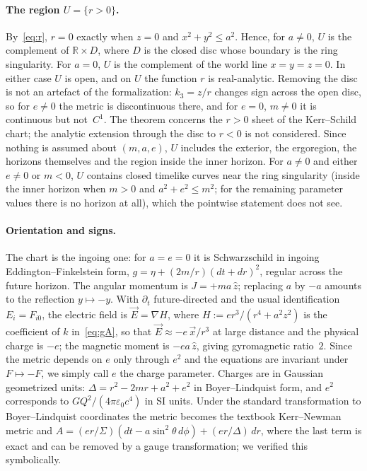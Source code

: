 \documentclass[11pt]{article}
\theoremstyle{definition}
\theoremstyle{remark}
\newcommand{\R}{\mathbb{R}}
\begin{document}
\paragraph{The region $U=\{r>0\}$.}
By~\eqref{eq:r}, $r=0$ exactly when $z=0$ and $x^2+y^2\le a^2$.
Hence, for $a\neq 0$, $U$ is the complement of $\R\times D$, where $D$ is the closed disc whose boundary is the ring singularity.
For $a=0$, $U$ is the complement of the world line $x=y=z=0$.
In either case $U$ is open, and on $U$ the function $r$ is real-analytic.
Removing the disc is not an artefact of the formalization: $k_3=z/r$ changes sign across the open disc, so for $e\neq0$ the metric is discontinuous there, and for $e=0$, $m\ne0$ it is continuous but not~$C^1$.
The theorem concerns the $r>0$ sheet of the Kerr--Schild chart; the analytic extension through the disc to $r<0$ is not considered.
Since nothing is assumed about $(m,a,e)$, $U$ includes the exterior, the ergoregion, the horizons themselves and the region inside the inner horizon.
For $a\neq0$ and either $e\ne0$ or $m<0$, $U$ contains closed timelike curves near the ring singularity (inside the inner horizon when $m>0$ and $a^2+e^2\le m^2$; for the remaining parameter values there is no horizon at all), which the pointwise statement does not see.

\paragraph{Orientation and signs.}
The chart is the ingoing one: for $a=e=0$ it is Schwarzschild in ingoing Eddington--Finkelstein form, $g=\eta+(2m/r)(dt+dr)^2$, regular across the future horizon.
The angular momentum is $J=+ma\,\hat z$; replacing $a$ by $-a$ amounts to the reflection $y\mapsto-y$.
With $\partial_t$ future-directed and the usual identification $E_i=F_{i0}$, the electric field is $\vec E=\nabla H$, where $H:=er^3/(r^4+a^2z^2)$ is the coefficient of $k$ in~\eqref{eq:gA}, so that $\vec E\approx -e\,\vec x/r^3$ at large distance and the physical charge is $-e$; the magnetic moment is $-ea\,\hat z$, giving gyromagnetic ratio~$2$.
Since the metric depends on $e$ only through $e^2$ and the equations are invariant under $F\mapsto-F$, we simply call $e$ the charge parameter.
Charges are in Gaussian geometrized units: $\Delta=r^2-2mr+a^2+e^2$ in Boyer--Lindquist form, and $e^2$ corresponds to $GQ^2/(4\pi\varepsilon_0c^4)$ in SI units.
Under the standard transformation to Boyer--Lindquist coordinates the metric becomes the textbook Kerr--Newman metric and $A=(er/\Sigma)(dt-a\sin^2\theta\,d\phi)+(er/\Delta)\,dr$, where the last term is exact and can be removed by a gauge transformation; we verified this symbolically.
\end{document}
